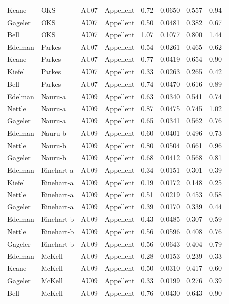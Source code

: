 \documentclass{monashthesis}
\begin{document}
\begin{center}
\begin{longtable}{llllllll}
Keane & OKS & AU07 & Appellent & 0.72 & 0.0650 & 0.557 & 0.94 \\
Gageler & OKS & AU07 & Appellent & 0.50 & 0.0481 & 0.382 & 0.67 \\
Bell & OKS & AU07 & Appellent & 1.07 & 0.1077 & 0.800 & 1.44 \\
Edelman & Parkes & AU07 & Appellent & 0.54 & 0.0261 & 0.465 & 0.62 \\
Keane & Parkes & AU07 & Appellent & 0.77 & 0.0419 & 0.654 & 0.90 \\
Kiefel & Parkes & AU07 & Appellent & 0.33 & 0.0263 & 0.265 & 0.42 \\
Bell & Parkes & AU07 & Appellent & 0.74 & 0.0470 & 0.616 & 0.89 \\
Edelman & Nauru-a & AU09 & Appellent & 0.63 & 0.0340 & 0.541 & 0.74 \\
Nettle & Nauru-a & AU09 & Appellent & 0.87 & 0.0475 & 0.745 & 1.02 \\
Gageler & Nauru-a & AU09 & Appellent & 0.65 & 0.0341 & 0.562 & 0.76 \\
Edelman & Nauru-b & AU09 & Appellent & 0.60 & 0.0401 & 0.496 & 0.73 \\
Nettle & Nauru-b & AU09 & Appellent & 0.80 & 0.0504 & 0.661 & 0.96 \\
Gageler & Nauru-b & AU09 & Appellent & 0.68 & 0.0412 & 0.568 & 0.81 \\
Edelman & Rinehart-a & AU09 & Appellent & 0.34 & 0.0151 & 0.301 & 0.39 \\
Kiefel & Rinehart-a & AU09 & Appellent & 0.19 & 0.0172 & 0.148 & 0.25 \\
Nettle & Rinehart-a & AU09 & Appellent & 0.51 & 0.0219 & 0.453 & 0.58 \\
Gageler & Rinehart-a & AU09 & Appellent & 0.39 & 0.0170 & 0.339 & 0.44 \\
Edelman & Rinehart-b & AU09 & Appellent & 0.43 & 0.0485 & 0.307 & 0.59 \\
Nettle & Rinehart-b & AU09 & Appellent & 0.56 & 0.0596 & 0.408 & 0.76 \\
Gageler & Rinehart-b & AU09 & Appellent & 0.56 & 0.0643 & 0.404 & 0.79 \\
Edelman & McKell & AU09 & Appellent & 0.28 & 0.0153 & 0.239 & 0.33 \\
Keane & McKell & AU09 & Appellent & 0.50 & 0.0310 & 0.417 & 0.60 \\
Gageler & McKell & AU09 & Appellent & 0.33 & 0.0199 & 0.276 & 0.39 \\
Bell & McKell & AU09 & Appellent & 0.76 & 0.0430 & 0.643 & 0.90 \\

\end{longtable}
\end{center}
\end{document}
